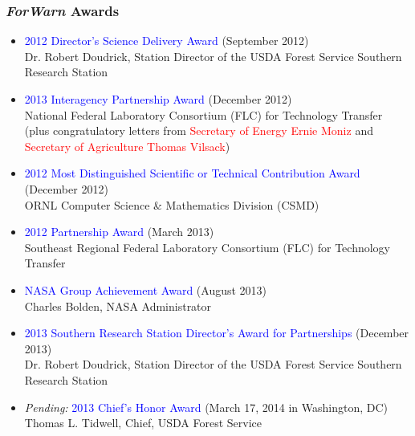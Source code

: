 \begin{frame}
 \frametitle{\textit{ForWarn} Awards}\scriptsize
 \vskip-0.15in
 \begin{itemize}
  \item \textcolor{blue}{2012 Director's Science Delivery Award} (September 2012) \\
        Dr. Robert Doudrick, Station Director of the USDA Forest Service Southern Research Station
  \item \textcolor{blue}{2013 Interagency Partnership Award} (December 2012) \\
        National Federal Laboratory Consortium (FLC) for Technology Transfer (plus congratulatory letters from \textcolor{red}{Secretary of Energy Ernie Moniz} and \textcolor{red}{Secretary of Agriculture Thomas Vilsack})
  \item \textcolor{blue}{2012 Most Distinguished Scientific or Technical Contribution Award} (December 2012) \\
        ORNL Computer Science \& Mathematics Division (CSMD)
  \item \textcolor{blue}{2012 Partnership Award} (March 2013) \\
        Southeast Regional Federal Laboratory Consortium (FLC) for Technology Transfer
  \item \textcolor{blue}{NASA Group Achievement Award} (August 2013) \\
        Charles Bolden, NASA Administrator
  \item \textcolor{blue}{2013 Southern Research Station Director's Award for Partnerships} (December 2013) \\
        Dr. Robert Doudrick, Station Director of the USDA Forest Service Southern Research Station
  \item \textit{Pending:} \textcolor{blue}{2013 Chief's Honor Award} (March 17, 2014 in Washington, DC) \\
        Thomas L. Tidwell, Chief, USDA Forest Service
 
 \end{itemize}
\end{frame}

